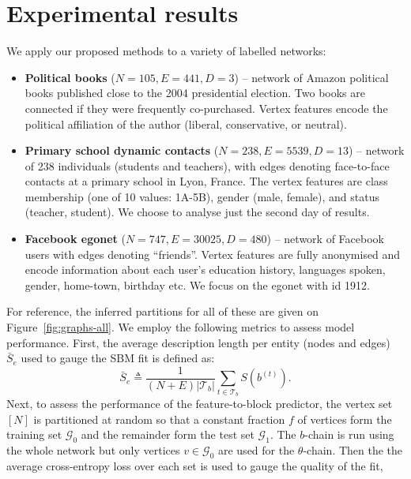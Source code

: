 \section{Experimental results}
\label{sec:experiments}

We apply our proposed methods to a variety of labelled networks:

\begin{itemize}
	\item \textbf{Political books} \cite{polbooks} ($N=105, E=441, D=3$) -- network of Amazon political books published close to the 2004 presidential election. Two books are connected if they were frequently co-purchased. Vertex features encode the political affiliation of the author (liberal, conservative, or neutral).
	\item \textbf{Primary school dynamic contacts} \cite{schools} ($N=238, E=5539, D=13$) -- network of 238 individuals (students and teachers),
with edges denoting face-to-face contacts at a primary school in Lyon, France. 
The vertex features are class membership (one of 10 values: 1A-5B), gender (male, female), and status (teacher, student). We choose to analyse just the second day of results.
	\item \textbf{Facebook egonet} \cite{fb-snap} ($N=747, E=30025, D=480$) -- network of Facebook users with edges denoting ``friends''.
Vertex features are fully anonymised and encode information about each user's education history, languages spoken, gender, home-town, birthday etc. We focus on the egonet with id 1912.
\end{itemize}
%
For reference, the inferred partitions for all of these are given on Figure~\ref{fig:graphs-all}.
We employ the following metrics to assess model performance. 
First, the average
description length per entity (nodes and edges) 
$\bar{S}_e$ 
used to gauge the SBM fit is defined as:
%
\begin{equation}
	\bar{S}_e \triangleq \frac{1}{(N+E) |\mathcal{T}_b|} \sum_{t\in \mathcal{T}_b} S \left( b^{(t)} \right).
	\label{eqn:mean-dl}
\end{equation}
%
Next, to assess the performance of the feature-to-block predictor, 
the vertex set $[N]$ 
is partitioned at random so that 
a constant fraction $f$ of vertices form the training set $\mathcal{G}_0$ and 
the remainder form the test set $\mathcal{G}_1$.
The $b$-chain is run using the whole network but only vertices $v \in \mathcal{G}_0$ are 
used for the $\theta$-chain. 
Then the  the average cross-entropy loss 
over each set is used to gauge the quality of the fit,
